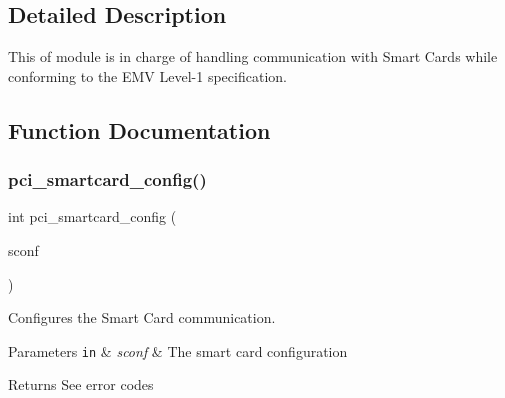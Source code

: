 \subsection{Detailed Description}
This of module is in charge of handling communication with Smart Cards while conforming to the E\+MV Level-\/1 specification. 

\subsection{Function Documentation}
\hypertarget{group__pcibx__sc_gac227636b4a270677ea489d54bfa9262e}{}\label{group__pcibx__sc_gac227636b4a270677ea489d54bfa9262e} 
\subsubsection{\texorpdfstring{pci\+\_\+smartcard\+\_\+config()}{pci\_smartcard\_config()}}
{\footnotesize\ttfamily int pci\+\_\+smartcard\+\_\+config (\begin{DoxyParamCaption}\item[{S\+C\+A\+R\+D\+\_\+\+C\+O\+NF}]{sconf }\end{DoxyParamCaption})}



Configures the Smart Card communication. 


\begin{DoxyParams}[1]{Parameters}
\mbox{\tt in}  & {\em sconf} & The smart card configuration\\
\hline
\end{DoxyParams}
\begin{DoxyReturn}{Returns}
See error codes 
\end{DoxyReturn}
\hypertarget{group__pcibx__sc_gaa97512bc1e0389c8528b90e2d2d05ad0}{}\label{group__pcibx__sc_gaa97512bc1e0389c8528b90e2d2d05ad0} 
